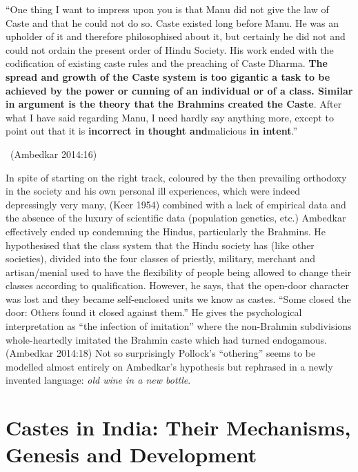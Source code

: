 \begin{myquote}
“One thing I want to impress upon you is that Manu did not give the law of Caste and that he could not do so. Caste existed long before Manu. He was an upholder of it and therefore philosophised about it, but certainly he did not and could not ordain the present order of Hindu Society. His work ended with the codification of existing caste rules and the preaching of Caste Dharma. \textbf{The spread and growth of the Caste system is too gigantic a task to be achieved by the power or cunning of an individual or of a class. Similar in argument is the theory that the Brahmins created the Caste}. After what I have said regarding Manu, I need hardly say anything more, except to point out that it is \textbf{incorrect in thought and}malicious \textbf{in intent}.” 

~\hfill (Ambedkar 2014:16)
\end{myquote}

In spite of starting on the right track, coloured by the then prevailing orthodoxy in the society and his own personal ill experiences, which were indeed depressingly very many, (Keer 1954) combined with a lack of empirical data and the absence of the luxury of scientific data (population genetics, etc.) Ambedkar effectively ended up condemning the Hindus, particularly the Brahmins. He hypothesised that the class system that the Hindu society has (like other societies), divided into the four classes of priestly, military, merchant and artisan/menial used to have the flexibility of people being allowed to change their classes according to qualification. However, he says, that the open-door character was lost and they became self-enclosed units we know as castes. “Some closed the door: Others found it closed against them.” He gives the psychological interpretation as “the infection of imitation” where the non-Brahmin subdivisions whole-heartedly imitated the Brahmin caste which had turned endogamous. (Ambedkar 2014:18) Not so surprisingly Pollock's “othering” seems to be modelled almost entirely on Ambedkar's hypothesis but rephrased in a newly invented language: \textit{old wine in a new bottle}.


\section*{Castes in India: Their Mechanisms, Genesis and Development}

